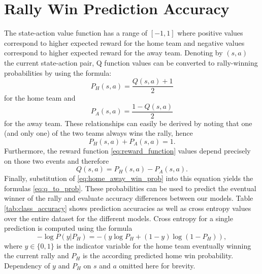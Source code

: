 \documentclass{sfuthesis}
\begin{document}
	\section{Rally Win Prediction Accuracy}
	The state-action value function has a range of $[-1,1]$ where positive values correspond to higher expected reward for the home team and negative values correspond to higher expected reward for the away team. Denoting by $(s,a)$ the current state-action pair, Q function values can be converted to rally-winning probabilities by using the formula:
	\begin{equation}
		P_H(s,a) = \frac{Q(s,a)+1}{2}
		\label{eq:q_to_prob}
	\end{equation}
	for the home team and
	\begin{equation}
		P_A(s,a) = \frac{1-Q(s,a)}{2}
	\end{equation}
	for the away team. These  relationships can easily be derived by noting that one (and only one) of the two teams always wins the rally, hence \begin{equation}
		P_H(s,a) + P_A(s,a) = 1.
		\label{eq:home_away_win_prob}
	\end{equation}
	Furthermore, the reward function  \eqref{eq:reward_function} values depend precisely on those two events and therefore
	$$Q(s,a) = P_H(s,a) - P_A(s,a).$$
	Finally, substitution of \eqref{eq:home_away_win_prob} into this equation yields the formulas \eqref{eq:q_to_prob}. These probabilities can be used to predict the eventual winner of the rally and evaluate accuracy differences between our models. Table \ref{tab:class_accuracy} shows prediction accuracies as well as cross entropy values over the entire dataset for the different models. Cross entropy for a single prediction is computed using the formula
	\begin{equation}
		-\log P(y|P_H) = - (y \log P_H + (1-y) \log(1-P_H)),
	\end{equation}
	where $y \in \{0,1\}$ is the indicator variable for the home team eventually winning the current rally and $P_H$ is the according predicted home win probability. Dependency of $y$ and $P_H$ on $s$ and $a$ omitted here for brevity.
	
\end{document}
